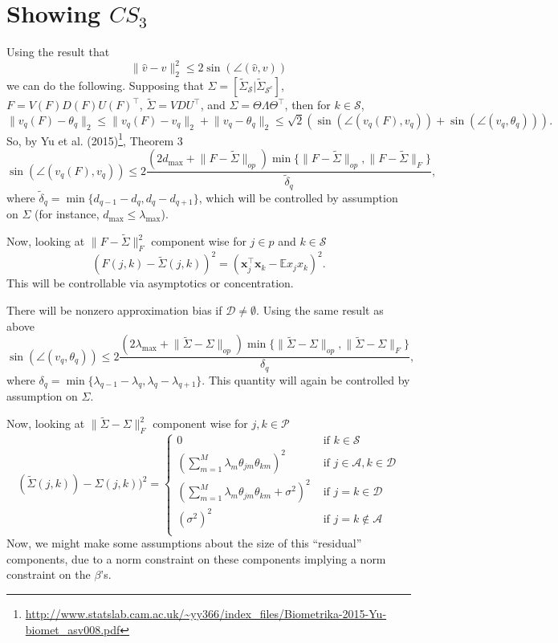 \documentclass[11pt]{article}
\newcommand{\E}{\mathbb{E}}
\newcommand{\norm}[1]{\lVert #1 \rVert}
\newcommand{\A}{\mathcal{A}}
\renewcommand{\S}{\mathcal{S}}
\newcommand{\D}{\mathcal{D}}
\newcommand{\x}{\mathbf{x}}
\newcommand{\PP}{\mathcal{P}}
\begin{document}
\section{Showing $CS_3$}
Using the result that
\[
\norm{\hat{v} - v}_2^2 \leq 2 \sin(\angle (\hat{v},v) )
\]
we can do the following.  Supposing that 
$\Sigma = [\tilde{\Sigma}_\S | \tilde{\Sigma}_{\S^c}]$, $F = V(F) D(F) U(F)^{\top}$, $\tilde{\Sigma} = V DU^{\top}$, and $\Sigma = \Theta \Lambda \Theta^{\top}$, then for $k \in \S$,
\[
\norm{v_q(F) - \theta_q}_2 \leq  \norm{v_q(F) - v_q}_2 + \norm{v_q - \theta_q}_2 \leq \sqrt{2}\left( \sin(\angle (v_q(F), v_q)) + \sin(\angle (v_q,\theta_q))\right).
\]
So, by Yu et al. (2015)\footnote{\url{http://www.statslab.cam.ac.uk/~yy366/index_files/Biometrika-2015-Yu-biomet_asv008.pdf}}, Theorem 3
\[
 \sin(\angle (v_q(F), v_q)) 
 \leq 
 2\frac{(2d_{\max} + \norm{F - \tilde{\Sigma}}_{op})\min\{ \norm{F - \tilde{\Sigma}}_{op}, \norm{F - \tilde{\Sigma}}_{F}\}}{\tilde{\delta}_q},
\]
where $\tilde{\delta}_q = \min\{d_{q-1} - d_q, d_{q} - d_{q+1}\}$, which will be controlled by assumption on $\Sigma$ (for instance, $d_{\max} \leq \lambda_{\max}$).

Now, looking at $\norm{F - \tilde{\Sigma}}_{F}^2$ component wise for $j \in p$ and $k \in \S$
\[
(F(j,k) - \tilde{\Sigma}(j,k))^2 = (\x_j^{\top}\x_k - \E x_jx_k)^2.
\]
This will be controllable via asymptotics or concentration. 

There will be nonzero approximation bias if $\D \neq \emptyset$.  Using the same result as above
\[
\sin(\angle (v_q,\theta_q))
\leq 
2\frac{(2\lambda_{\max} + \norm{ \tilde{\Sigma} - \Sigma}_{op})\min\{\norm{\tilde{\Sigma} - \Sigma}_{op}, \norm{\tilde{\Sigma} - \Sigma}_{F}\}}{\delta_q},
\]
where $\delta_q = \min\{\lambda_{q-1} - \lambda_q, \lambda_{q} - \lambda_{q+1}\}$.  This quantity will again be controlled by assumption on $\Sigma$. 

Now, looking at $\norm{\tilde{\Sigma} - \Sigma}_{F}^2$ component wise for $j,k \in \PP$
\[
( \tilde{\Sigma}(j,k)) - \Sigma(j,k))^2 
= 
\begin{cases}
0 & \textrm{ if } k \in \S \\
(\sum_{m = 1}^M \lambda_m \theta_{jm} \theta_{km})^2  & \textrm{ if } j \in \A,k \in \D \\
(\sum_{m = 1}^M \lambda_m \theta_{jm} \theta_{km}  + \sigma^2)^2 & \textrm{ if } j = k \in \D \\
(\sigma^2)^2 & \textrm{ if } j = k \notin \A \\
\end{cases}
\]
Now, we might make some assumptions about the size of this ``residual'' components, due to a norm constraint on these components implying a norm constraint on the $\beta$'s. 
\end{document}
